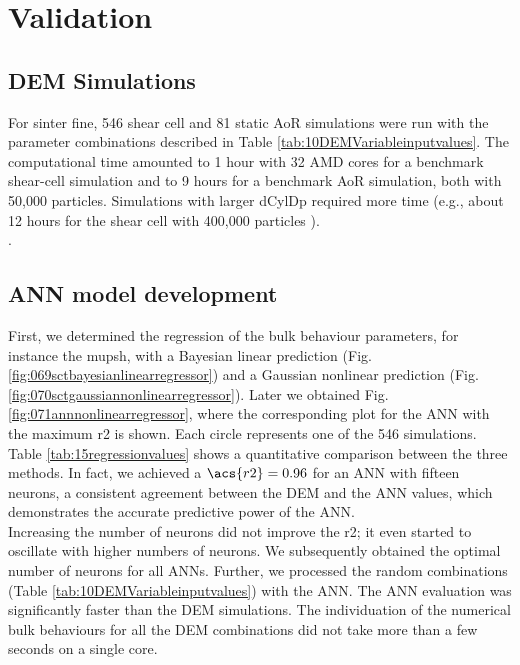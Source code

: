 
\chapter{Validation}
\label{cap:validation}

\section{DEM Simulations}
\label{sec:simulations}

For sinter fine, 546 shear cell and 81 static \acs{AoR} simulations 
were run with
the parameter combinations described in Table
\ref{tab:10DEMVariableinputvalues}.
The computational time amounted to 1 hour with 32 AMD cores for a benchmark
shear-cell simulation and to 9 hours for a benchmark \acs{AoR} simulation, both with
50,000 particles.
Simulations with larger \acs{dCylDp} required more time (e.g., about 12 hours for
the shear cell with 400,000 particles ). \\

.

\section{ANN model development}
\label{sec:annmodeldev}



First, we determined the regression of the bulk behaviour parameters, for
instance the \acs{mupsh}, 
with a Bayesian linear prediction (Fig.
\ref{fig:069sctbayesianlinearregressor}) and a Gaussian nonlinear prediction
(Fig.  \ref{fig:070sctgaussiannonlinearregressor}). 
Later we obtained Fig.
\ref{fig:071annnonlinearregressor}, where the corresponding plot for the \acs{ANN} with the maximum \acs{r2} is shown. 
Each circle represents one of the 546 simulations.
Table \ref{tab:15regressionvalues} shows a quantitative comparison between the
three methods. 
In fact, 
we achieved a $\acs{r2} = 0.96$ for an \acs{ANN} with fifteen neurons,
a consistent agreement between the 
\acs{DEM} and the \acs{ANN} values, which demonstrates the accurate predictive power of
the \acs{ANN}.\\ 
Increasing the number of neurons did not improve the \acs{r2}; it even started to
oscillate with higher numbers of neurons.
We subsequently obtained the optimal number of neurons for all \acs{ANNs}.
Further, we processed the random combinations (Table
\ref{tab:10DEMVariableinputvalues}) with the \acs{ANN}.
The \acs{ANN} evaluation was significantly faster than the \acs{DEM} simulations. The
individuation of the numerical bulk behaviours for all the \acs{DEM} combinations
did not take more than a few seconds on a single core.


